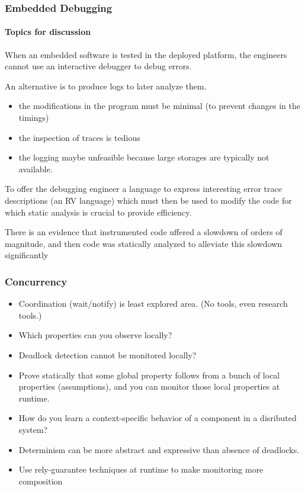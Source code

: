 \documentclass{beamer}
\begin{document}
\begin{frame}
  \frametitle{Embedded Debugging}
  \framesubtitle{Topics for discussion}

When an embedded software is tested in the deployed platform, the
engineers cannot use an interactive debugger to debug errors. 

An alternative is to produce logs to later analyze them.
\begin{itemize} 
\item the modifications in the program must be minimal (to prevent changes in
the timings) 
\item the inspection of traces is tedious
\item the logging
maybe unfeasible because large storages are typically not available. 
\end{itemize}

To offer the debugging engineer a language to
express interesting error trace descriptions (an RV language) which
must then be used to modify the code for which static analysis is
crucial to provide efficiency. 

There is an evidence that
instrumented code uffered a slowdown of orders of magnitude, and
then code was statically analyzed to alleviate this slowdown
significantly 

\end{frame}


\begin{frame}
  \frametitle{Concurrency}

\begin{itemize}

\item Coordination (wait/notify) is least explored area. (No tools, even research tools.)

\item Which properties can you observe locally? 

\item Deadlock detection cannot be monitored locally?

\item Prove statically that some global property follows from a bunch of local properties (assumptions), and you can monitor those local properties at runtime.

\item How do you learn a context-specific behavior of a component in a disributed system?

\item Determinism can be more abstract and expressive than absence of deadlocks.

\item Use rely-guarantee techniques at runtime to make monitoring more composition

\end{itemize}

\end{frame}
\end{document}
